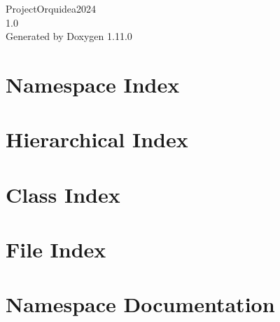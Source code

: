 \documentclass[twoside]{book}
\newcommand{\+}{\discretionary{\mbox{\scriptsize$\hookleftarrow$}}{}{}}
\newcommand{\clearemptydoublepage}{%
    \newpage{\pagestyle{empty}\cleardoublepage}%
  }
\begin{document}
  \raggedbottom
    \hypersetup{pageanchor=false,
                bookmarksnumbered=true,
                pdfencoding=unicode
               }
  \begin{titlepage}
  \vspace*{7cm}
  \begin{center}%
  {\Large Project\+Orquidea2024}\\
  [1ex]\large 1.\+0 \\
  \vspace*{1cm}
  {\large Generated by Doxygen 1.11.0}\\
  \end{center}
  \end{titlepage}
  \clearemptydoublepage
  \tableofcontents
  \clearemptydoublepage
  \hypersetup{pageanchor=true}
\chapter{Namespace Index}

\chapter{Hierarchical Index}

\chapter{Class Index}

\chapter{File Index}

\chapter{Namespace Documentation}



















\end{document}

